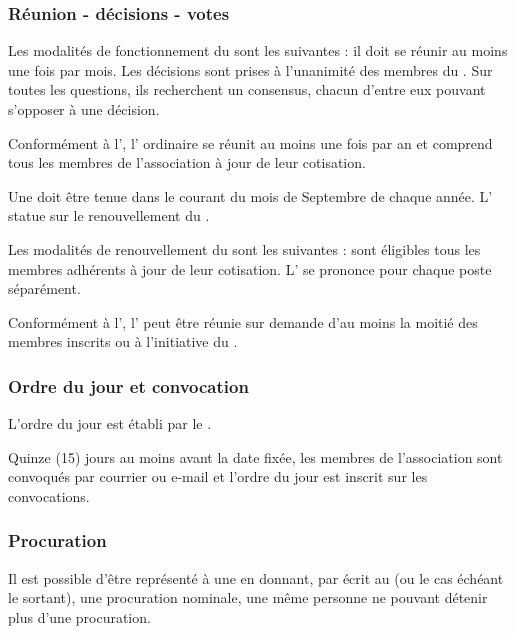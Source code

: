 \subsubsection*{Réunion - décisions - votes}

Les modalités de fonctionnement du \bureau{} sont les suivantes : il
doit se réunir au moins une fois par mois. Les décisions sont
prises à l'unanimité des membres du \bureau{}. Sur toutes les questions,
ils recherchent un consensus, chacun d'entre eux pouvant s'opposer à
une décision.

\label{sec:assembl-gener-ordin}
Conformément à l', l'\AG{} ordinaire se réunit au moins une fois par an et comprend tous les membres de l'association à jour de leur cotisation.

Une \AG{} doit être tenue dans le courant du mois de Septembre de chaque année. L'\AG{} statue sur le renouvellement du \bureau{}.

Les modalités de renouvellement du \bureau{} sont les suivantes : sont éligibles tous les membres adhérents à jour de leur cotisation. L'\AG{} se prononce pour chaque poste séparément.

\label{sec:age}
Conformément à l', l'\AGE{} peut être réunie sur demande d'au moins la moitié des membres inscrits ou à l'initiative du \bureau{}.

\label{sec:ag}

\subsubsection*{Ordre du jour et convocation}

L'ordre du jour est établi par le \bureau{}.

Quinze (15) jours au moins avant la date fixée, les membres de
l'association sont convoqués par courrier ou e-mail et l'ordre du jour est inscrit
sur les convocations.


\subsubsection*{Procuration}

Il est possible d'être représenté à une \AG{} en donnant,
par écrit au \bureau{} (ou le cas échéant le \bureau{} sortant), une procuration nominale, une même personne ne pouvant détenir plus
d'une procuration.

